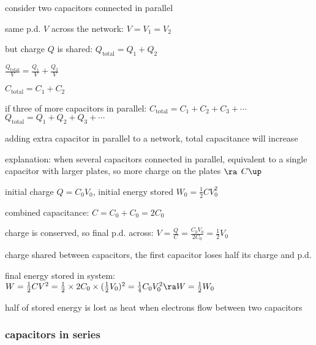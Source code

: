 consider two capacitors connected in parallel

same p.d. $V$ across the network: $V=V_1=V_2$

but charge $Q$ is shared: $Q_\text{total} = Q_1 + Q_2$

{

\centering

$\frac{Q_\text{total}}{V} = \frac{Q_1}{V} + \frac{Q_2}{V}$

$C_\text{total} = C_1 + C_2$

}


if three of more capacitors in parallel: $\boxed{C_\text{total} = C_1 + C_2 + C_3 + \cdots}$ $\quad$ $\boxed{Q_\text{total} = Q_1 + Q_2 + Q_3 + \cdots}$

\cmt adding extra capacitor in parallel to a network, total capacitance will increase

explanation: when several capacitors connected in parallel, equivalent to a single capacitor with larger plates, so more charge on the plates $\ra$ $C\up$


\sol initial charge $Q=C_0 V_0$, initial energy stored $W_0 = \frac{1}{2} C V_0^2$

combined capacitance: $C= C_0 + C_0 = 2C_0$

charge is conserved, so final p.d. across: $V = \frac{Q}{C} = \frac{C_0 V_0}{2C_0} = \frac{1}{2} V_0$


charge shared between capacitors, the first capacitor loses half its charge and p.d.

final energy stored in system: $W = \frac{1}{2}CV^2 = \frac{1}{2} \times 2C_0 \times (\frac{1}{2}V_0)^2 = \frac{1}{4} C_0 V_0^2 \ra W = \frac{1}{2} W_0$

half of stored energy is lost as heat when electrons flow between two capacitors \eoe



\newpage

\subsubsection{capacitors in series}

